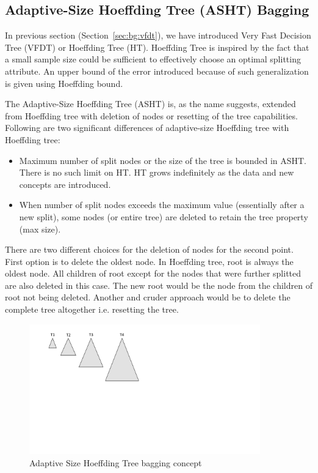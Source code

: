 \subsection{Adaptive-Size Hoeffding Tree (ASHT) Bagging}
\label{sec:bg:asht}
In previous section (Section~\ref{sec:bg:vfdt}), we have introduced Very Fast Decision Tree (VFDT) or Hoeffding Tree (HT). Hoeffding Tree is inspired by the fact that a small sample size could be sufficient to effectively choose an optimal splitting attribute. An upper bound of the error introduced because of such generalization is given using Hoeffding bound.

The Adaptive-Size Hoeffding Tree (ASHT) is, as the name suggests, extended from Hoeffding tree with deletion of nodes or resetting of the tree capabilities. Following are two significant differences of adaptive-size Hoeffding tree with Hoeffding tree: 
\begin{itemize}
    \item Maximum number of split nodes or the size of the tree is bounded in ASHT. There is no such limit on HT. HT grows indefinitely as the data and new concepts are introduced.
    \item When number of split nodes exceeds the maximum value (essentially after a new split), some nodes (or entire tree) are deleted to retain the tree property (max size).
\end{itemize}
There are two different choices for the deletion of nodes for the second point. First option is to delete the oldest node. In Hoeffding tree, root is always the oldest node. All children of root except for the nodes that were further splitted are also deleted in this case. The new root would be the node from the children of root not being deleted. Another and cruder approach would be to delete the complete tree altogether i.e. resetting the tree. 

\begin{figure}[htbp]
    \begin{center}
        \includegraphics[width=10.0cm]{figs/ashtbagging.pdf}
        \caption{Adaptive Size Hoeffding Tree bagging concept}
        \label{fig:bg:asht}
    \end{center}
\end{figure}

